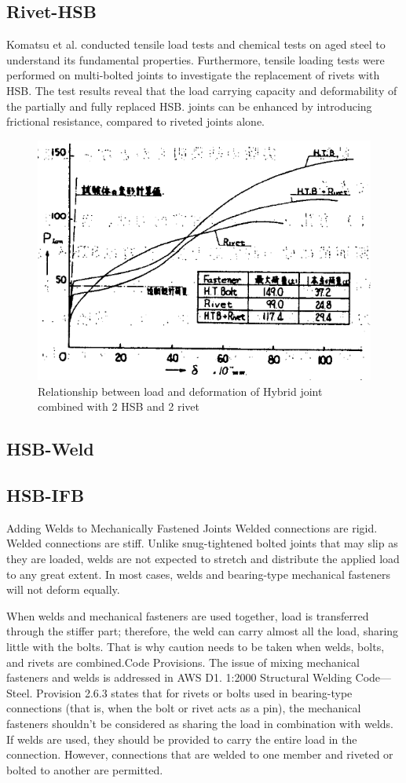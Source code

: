\subsection{Rivet-HSB}

Komatsu et al.\cite{KOMATSU2015} conducted tensile load tests and chemical tests on aged steel to understand its fundamental properties. Furthermore, tensile loading tests were performed on multi-bolted joints to investigate the replacement of rivets with HSB. The test results reveal that the load carrying capacity and deformability of the partially and fully replaced HSB. joints can be enhanced by introducing frictional resistance, compared to riveted joints alone.

\begin{figure}
    \centering
\includegraphics[width=0.5\linewidth]{imgs//ch2/hsbrivet-1967-pd.png}
    \caption{Relationship between load and deformation of Hybrid joint combined with 2 HSB and 2 rivet}
    \label{fig-hsbriv-fune}
\end{figure}
\subsection{HSB-Weld}

\subsection{HSB-IFB}

\label{sec-hsbweld}

Adding Welds to Mechanically Fastened Joints Welded connections are rigid. Welded connections are stiff. Unlike snug-tightened bolted joints that may slip as they are loaded, welds are not expected to stretch and distribute the applied load to any great extent. In most cases, welds and bearing-type mechanical fasteners will not deform equally.

When welds and mechanical fasteners are used together, load is transferred through the stiffer part; therefore, the weld can carry almost all the load, sharing little with the bolts. That is why caution needs to be taken when welds, bolts, and rivets are combined.Code Provisions. The issue of mixing mechanical fasteners and welds is addressed in AWS D1. 1:2000 Structural Welding Code—Steel. Provision 2.6.3 states that for rivets or bolts used in bearing-type connections (that is, when the bolt or rivet acts as a pin), the mechanical fasteners shouldn't be considered as sharing the load in combination with welds. If welds are used, they should be provided to carry the entire load in the connection. However, connections that are welded to one member and riveted or bolted to another are permitted.

